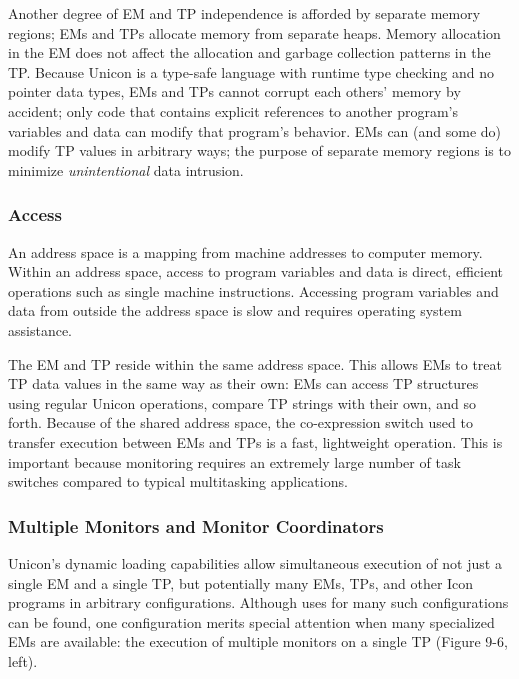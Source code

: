 Another degree of EM and TP independence is afforded by separate
memory regions; EMs and TPs allocate memory from separate heaps.
Memory allocation in the EM does not affect the allocation
and garbage collection patterns in the TP. Because Unicon is a type-safe
language with runtime type checking and no pointer data types, EMs
and TPs cannot corrupt each others' memory by accident; only code that
contains explicit references to another program's variables and data
can modify that program's behavior.
EMs can (and some do) modify TP values in arbitrary ways; the purpose
of separate memory regions is to minimize {\em unintentional\/} data
intrusion.


\subsubsection{Access}

An address space is a mapping from machine addresses to computer memory.
Within an address space, access to program variables and data is direct,
efficient operations such as single machine instructions.  Accessing
program variables and data from outside the address space is slow and
requires operating system assistance.

The EM and TP reside within the same address space.  This allows EMs to
treat TP data values in the same way as their own: EMs can access TP
structures using regular Unicon operations, compare TP strings with their own,
and so forth.
Because of the shared address space, the co-expression switch used
to transfer execution between EMs and TPs is a fast,
lightweight operation.  This is important because monitoring
requires an extremely large number of task switches compared to
typical multitasking applications.


\subsubsection{Multiple Monitors and Monitor Coordinators}

Unicon's dynamic loading capabilities allow simultaneous execution of
not just a single EM and a single TP, but potentially many EMs, TPs,
and other Icon programs in arbitrary configurations.  Although uses
for many such configurations can be found, one configuration merits
special attention when many specialized EMs are available: the
execution of multiple monitors on a single TP 
(Figure 9-6, left).

